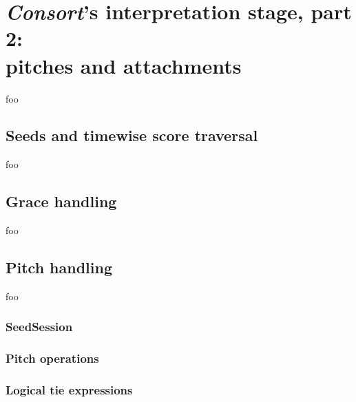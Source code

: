 \chapter[\emph{Consort}'s interpretation stage, part 2: pitches and attachments]{
    \emph{Consort}'s interpretation stage, part 2:\\ pitches and attachments}

foo

\section{Seeds and timewise score traversal}

foo

\section{Grace handling}

foo

\section{Pitch handling}

foo

\subsection{SeedSession}

\subsection{Pitch operations}

\subsection{Logical tie expressions}

